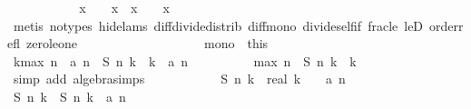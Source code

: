 \begin{isabellebody}
\ \ \ \ \ \ \ \ \isamarkupfalse%
\ \isamarkupfalse%
\ {\isachardoublequoteopen}{\isacharparenleft}x{}\ {\isacharminus}\ {}{\isacharparenright}\ {\isacharslash}\ x{}\ {\isasymle}\ {\isacharparenleft}x{}\ {\isacharminus}\ {}{\isacharparenright}\ {\isacharslash}\ x{}{\isachardoublequoteclose}\isanewline
\ \ \ \ \ \ \ \ \ \ \isamarkupfalse%
\ {\isacharparenleft}metis\ {\isacharparenleft}no{\isacharunderscore}types{\isacharcomma}\ hide{\isacharunderscore}lams{\isacharparenright}\ diff{\isacharunderscore}divide{\isacharunderscore}distrib\ diff{\isacharunderscore}mono\ divide{\isacharunderscore}self{\isacharunderscore}if\ frac{\isacharunderscore}le\ leD\ order{\isacharunderscore}refl\ zero{\isacharunderscore}le{\isacharunderscore}one{\isacharparenright}\ \ \ \ \ \ \ \ \ \ \isanewline
\ \ \ \ \ \ \isacommand{{\isacharbraceright}}\isamarkupfalse%
\ \isamarkupfalse%
\ mono\ {\isacharequal}\ this\isanewline
\isanewline
\isanewline
\ \ \ \ \ \ \isamarkupfalse%
\ {\isachardoublequoteopen}k{\isacharasterisk}{\isacharparenleft}{\isacharquery}max\ n\ {\isacharminus}\ a\ {\isacharparenleft}n{\isacharminus}{}{\isacharparenright}{\isacharparenright}\ {\isacharequal}\ {\isacharquery}S\ n\ k\ {\isacharminus}\ k\ {\isacharasterisk}\ a\ {\isacharparenleft}n{\isacharminus}{}{\isacharparenright}{\isachardoublequoteclose}\isanewline
\ \ \ \ \ \ \ \ \isamarkupfalse%
\ {\isacharbackquoteopen}{\isacharquery}max\ n\ {\isacharequal}\ {\isacharquery}S\ n\ k\ {\isacharslash}\ k{\isacharbackquoteclose}\isanewline
\ \ \ \ \ \ \ \ \isamarkupfalse%
\ {\isacharparenleft}simp\ add{\isacharcolon}\ algebra{\isacharunderscore}simps{\isacharparenright}\isanewline
\ \ \ \ \ \ \isamarkupfalse%
\ \isamarkupfalse%
\ {\isachardoublequoteopen}{\isachardot}{\isachardot}{\isachardot}\ {\isacharequal}\ {\isacharquery}S\ {\isacharparenleft}n{\isacharminus}{}{\isacharparenright}\ {\isacharparenleft}k{\isacharminus}{}{\isacharparenright}\ {\isacharminus}\ {\isacharparenleft}real\ k\ {\isacharminus}\ {}{\isacharparenright}\ {\isacharasterisk}\ a\ {\isacharparenleft}n{\isacharminus}{}{\isacharparenright}{\isachardoublequoteclose}\isanewline
\ \ \ \ \ \ \ \ \isamarkupfalse%
\ {\isacharbackquoteopen}{\isacharquery}S\ n\ k\ {\isacharequal}\ {\isacharquery}S\ {\isacharparenleft}n{\isacharminus}{}{\isacharparenright}\ {\isacharparenleft}k{\isacharminus}{}{\isacharparenright}\ {\isacharplus}\ a\ {\isacharparenleft}n{\isacharminus}{}{\isacharparenright}{\isacharbackquoteclose}\isanewline

\end{isabellebody}
